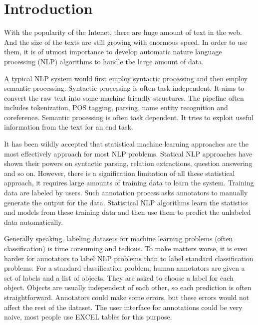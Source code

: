 \section{Introduction}

With the popularity of the Intenet, there are huge amount of text in the web. And the size of the texts are still growing with enormous speed. In order to use them, it is of utmost importance to develop automatic nature language processing (NLP) algorithms to handle tbe large amount of data. 

A typical NLP system would first employ syntactic processing and then employ semantic processing.  Syntactic processing is often task independent. It aims to convert the raw text into some machine friendly structures. The pipeline often includes tokenization, POS tagging, parsing, name entity recognition and coreference. Semantic processing is often task dependent. It tries to exploit useful information from the text for an end  task. 

It has been wildly accepted that statistical machine learning approaches are the most effectively approach for most NLP problems. Statical NLP approaches have shown their powers on syntactic parsing, relation extractions, question answering and so on. However, there is a signification limitation of all these statistical approach, it requires large amounts of training data to learn the system. Training data are labeled by users. Such annotation process asks annotators to manually generate the output for the data. Statistical NLP algorithms learn the statistics and models from these training data and then use them to predict the unlabeled data automatically.   

Generally speaking, labeling datasets for machine learning problems (often classification) is time consuming and tedious. To make matters worse, it is even harder for annotators to label NLP problems than to label standard classification problems. For a standard classification problem, human annotators are given a set of labels and a list of objects. They are asked to choose a label for each object. Objects are usually independent of each other, so each prediction is often straightforward. Annotators could make some errors, but these errors would not affect the rest of the dataset. The user interface for annotations could be very naive, most people use EXCEL tables for this purpose. 



